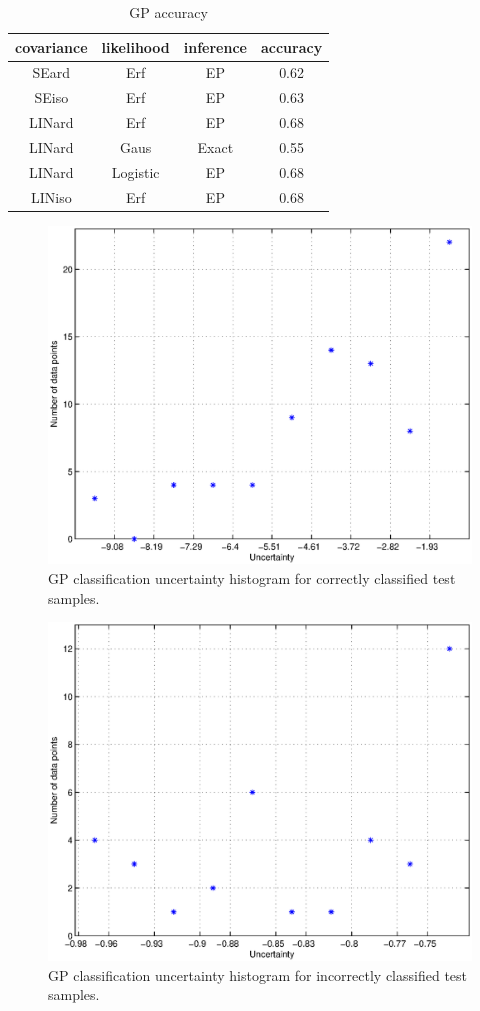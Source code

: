 \documentclass[journal, a4paper]{IEEEtran}
\begin{document}
      
    \begin{table}[h]
      \begin{center}
	\caption{GP accuracy}
	\label{tab:GP_acc}
	\begin{tabular}{c|c|c|c}
	  covariance & likelihood  & inference  & accuracy \\ \hline
	  SEard & Erf & EP & 0.62\\ \hline
	  SEiso & Erf & EP & 0.63\\ \hline
	  LINard & Erf & EP & 0.68\\ \hline
	  LINard & Gaus & Exact & 0.55\\ \hline
	  LINard & Logistic & EP & 0.68\\ \hline
	  LINiso & Erf & EP & 0.68
	\end{tabular}
      \end{center}
    \end{table}

    \begin{figure}[h]
      \centering
      \includegraphics[width=.8\linewidth]{covLINiso_gaussian_true}
      \caption{GP classification uncertainty histogram for correctly classified test samples.}
      \label{fig:GP_true}
    \end{figure}

    \begin{figure}[h]
      \centering
      \includegraphics[width=.8\linewidth]{covLINiso_gaussian_false}
      \caption{GP classification uncertainty histogram for incorrectly classified test samples.}
      \label{fig:GP_false}
    \end{figure}
\end{document}
